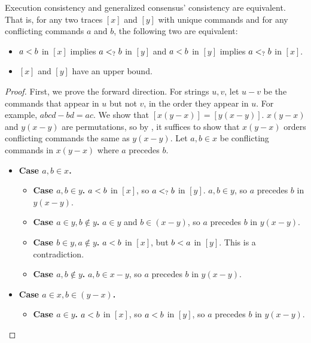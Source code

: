 \begin{theorem}
  Execution consistency and generalized consensus' consistency are equivalent.
  That is, for any two traces $[x]$ and $[y]$ with unique commands and for any
  conflicting commands $a$ and $b$, the following two are equivalent:
  \begin{itemize}
    \item
      $a < b$ in $[x]$ implies $a <_? b$ in $[y]$
      and
      $a < b$ in $[y]$ implies $a <_? b$ in $[x]$.
    \item
      $[x]$ and $[y]$ have an upper bound.
  \end{itemize}
\end{theorem}
\begin{proof}
  First, we prove the forward direction. For strings $u, v$, let $u - v$ be the
  commands that appear in $u$ but not $v$, in the order they appear in $u$. For
  example, $abcd - bd = ac$. We show that $[x(y-x)] = [y(x-y)]$. $x(y-x)$ and
  $y(x-y)$ are permutations, so by , it suffices to
  show that $x(y-x)$ orders conflicting commands the same as $y(x-y)$. Let $a,
  b \in x$ be conflicting commands in $x(y-x)$ where $a$ precedes $b$.
  \begin{itemize}
    \item \textbf{Case $a, b \in x$.}
      \begin{itemize}
        \item \textbf{Case $a, b \in y$.}
          $a < b$ in $[x]$, so $a <_? b$ in $[y]$.
          $a, b \in y$, so $a$ precedes $b$ in $y(x-y)$.

        \item \textbf{Case $a \in y, b \notin y$.}
          $a \in y$ and $b \in (x-y)$, so $a$ precedes $b$ in $y(x-y)$.

        \item \textbf{Case $b \in y, a \notin y$.}
          $a < b$ in $[x]$, but $b < a$ in $[y]$.
          This is a contradiction.

        \item \textbf{Case $a, b \notin y$.}
          $a, b \in x-y$, so $a$ precedes $b$ in $y(x-y)$.
      \end{itemize}


    \item \textbf{Case $a \in x, b \in (y-x)$.}
      \begin{itemize}
        \item \textbf{Case $a \in y$.}
          $a < b$ in $[x]$, so $a < b$ in $[y]$, so
          $a$ precedes $b$ in $y(x-y)$.


\end{itemize}
\end{itemize}
\end{proof}
